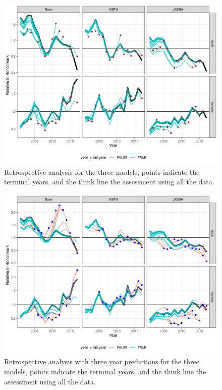 \documentclass[a4paper]{article}
\begin{document}
\begin{figure}[htbp]
\centering
\includegraphics[width=6in]{final-retro-1.png}
\caption{Retrospective analysis for the three models, points indicate the terminal years, and the think line the assessment using all the data.}
\label{fig:retro}
\end{figure}

\begin{figure}[htbp]
\centering
\includegraphics[width=6in]{final-retro3-1.png}
\caption{Retrospective analysis with three year predictions for the three models, points indicate the terminal years, and the think line the assessment using all the data.}
\label{fig:predictions}
\end{figure}
\end{document}

